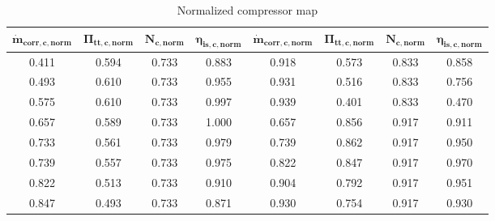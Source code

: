 \begin{longtable}[c]{@{}cccc|cccc@{}}
\caption{Normalized compressor map}
\label{tab:C7_compmap}\\
\toprule
$\mathbf{\dot{m}_{corr,c,norm}}$ & $\mathbf{\Pi_{tt,c,norm}}$ & $\mathbf{N_{c,norm}}$ & $\mathbf{\eta_{is,c,norm}}$ & $\mathbf{\dot{m}_{corr,c,norm}}$ & $\mathbf{\Pi_{tt,c,norm}}$ & $\mathbf{N_{c,norm}}$ & $\mathbf{\eta_{is,c,norm}}$ \\* \midrule
\endfirsthead
%
\endhead
%
\bottomrule
\endfoot
%
\endlastfoot
%
0.411                            & 0.594                      & 0.733                 & 0.883                       & 0.918                            & 0.573                      & 0.833                 & 0.858                       \\
0.493                            & 0.610                      & 0.733                 & 0.955                       & 0.931                            & 0.516                      & 0.833                 & 0.756                       \\
0.575                            & 0.610                      & 0.733                 & 0.997                       & 0.939                            & 0.401                      & 0.833                 & 0.470                       \\
0.657                            & 0.589                      & 0.733                 & 1.000                       & 0.657                            & 0.856                      & 0.917                 & 0.911                       \\
0.733                            & 0.561                      & 0.733                 & 0.979                       & 0.739                            & 0.862                      & 0.917                 & 0.950                       \\
0.739                            & 0.557                      & 0.733                 & 0.975                       & 0.822                            & 0.847                      & 0.917                 & 0.970                       \\
0.822                            & 0.513                      & 0.733                 & 0.910                       & 0.904                            & 0.792                      & 0.917                 & 0.951                       \\
0.847                            & 0.493                      & 0.733                 & 0.871                       & 0.930                            & 0.754                      & 0.917                 & 0.930                       \\

\end{longtable}
